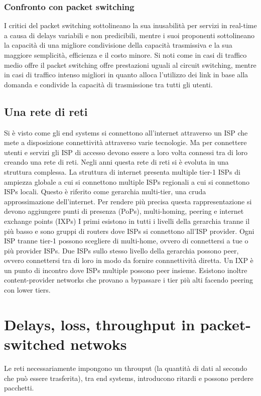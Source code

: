 \subsubsection{Confronto con packet switching}
I critici del packet switching sottolineano la sua inusabilit\`a per servizi in real-time a causa di delays variabili e non predicibili, mentre i suoi proponenti sottolineano la capacit\`a di una migliore condivisione 
della capacit\`a trasmissiva e la sua maggiore semplicit\`a, efficienza e il costo minore. Si noti come in casi di traffico medio offre il packet switching offre prestazioni uguali al circuit switching, mentre in casi
di traffico intenso migliori in quanto alloca l'utilizzo dei link in base alla domanda e condivide la capacit\`a di trasmissione tra tutti gli utenti. 
\subsection{Una rete di reti}
Si \`e visto come gli end systems si connettono all'internet attraverso un ISP che mete a disposizione connettivit\`a attraverso varie tecnologie. Ma per connettere utenti e servizi gli ISP di accesso devono essere
a loro volta connessi tra di loro creando una rete di reti. Negli anni questa rete di reti si \`e evoluta in una struttura complessa. La struttura di internet presenta multiple tier-1 ISPs di ampiezza globale a cui si 
connettono multiple ISPs regionali a cui si connettono ISPs locali. Questo \`e riferito come gerarchia multi-tier, una cruda approssimazione dell'internet. Per rendere pi\`u precisa questa rappresentazione 
si devono aggiungere punti di presenza (PoPs), multi-homing, peering e internet exchange points (IXPs) I primi esistono in tutti i livelli della gerarchia tranne il pi\`u basso e sono gruppi di routers dove ISPs
si connettono all'ISP provider. Ogni ISP tranne tier-1 possono scegliere di multi-home, ovvero di connettersi a tue o pi\`u provider ISPs. Due ISPs sullo stesso livello della gerarchia possono peer, ovvero 
connettersi tra di loro in modo da fornire connnettivit\`a diretta. Un IXP \`e un punto di incontro dove ISPs multiple possono peer insieme. Esistono inoltre content-provider networks che provano a bypassare
i tier pi\`u alti facendo peering con lower tiers. 
\section{Delays, loss, throughput in packet-switched netwoks}
Le reti necessariamente impongono un throuput (la quantit\`a di dati al secondo che pu\`o essere trasferita), tra end systems, introducono ritardi e possono perdere pacchetti. 
